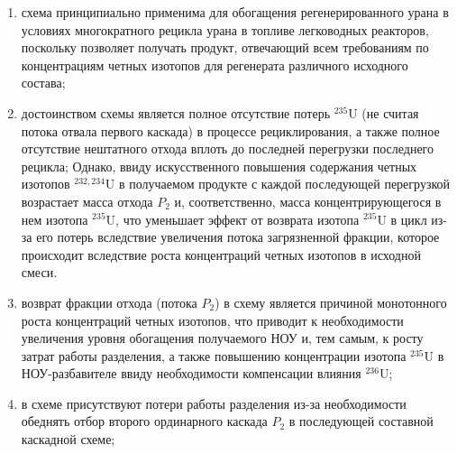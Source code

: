 \begin{enumerate}
    \item схема принципиально применима для обогащения регенерированного урана в условиях многократного рецикла урана в топливе легководных реакторов, поскольку позволяет получать продукт, отвечающий всем требованиям по концентрациям четных изотопов для регенерата различного исходного состава;
    \item достоинством схемы является полное отсутствие потерь $^{235}$U (не считая потока отвала первого каскада) в процессе рециклирования, а также полное отсутствие нештатного отхода вплоть до последней перегрузки последнего рецикла; Однако, ввиду искусственного повышения содержания четных изотопов $^{232,234}$U в получаемом продукте с каждой последующей перегрузкой возрастает масса отхода  $P_2$ и, соответственно, масса концентрирующегося в нем изотопа $^{235}$U, что уменьшает эффект от возврата изотопа $^{235}$U в цикл из-за его потерь вследствие увеличения потока загрязненной фракции, которое происходит вследствие роста концентраций четных изотопов в исходной смеси.
    \item возврат фракции отхода (потока $P_2$) в схему является причиной монотонного роста концентраций четных изотопов, что приводит к необходимости увеличения уровня обогащения получаемого НОУ и, тем самым, к росту затрат работы разделения, а также повышению концентрации изотопа $^{235}$U в НОУ-разбавителе ввиду необходимости компенсации влияния $^{236}$U;
    \item в схеме присутствуют потери работы разделения из-за необходимости обеднять отбор второго ординарного каскада $P_2$ в последующей составной каскадной схеме;
\end{enumerate}


